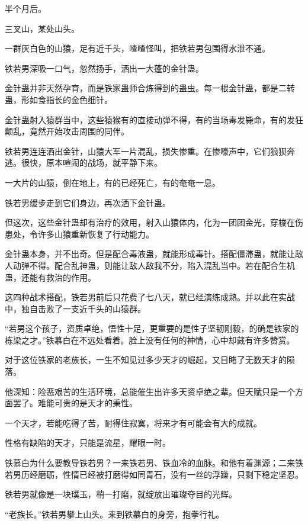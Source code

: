 
\begin{this_body}

半个月后。

三叉山，某处山头。

一群灰白色的山猿，足有近千头，喳喳怪叫，把铁若男包围得水泄不通。

铁若男深吸一口气，忽然扬手，洒出一大蓬的金针蛊。

金针蛊并非天然孕育，而是铁家蛊师合炼得到的蛊虫。每一根金针蛊，都是二转蛊，形如食指长的金色细针。

金针蛊射入猿群当中，这些猿猴有的直接动弹不得，有的当场毒发毙命，有的发狂颠乱，竟然开始攻击周围的同伴。

铁若男连连洒出金针，山猿大军一片混乱，损失惨重。在惨嚎声中，它们狼狈奔逃。很快，原本喧闹的战场，就平静下来。

一大片的山猿，倒在地上，有的已经死亡，有的奄奄一息。

铁若男缓步走到它们身边，再次洒下金针蛊。

但这次，这些金针蛊却有治疗的效用，射入山猿体内，化为一团团金光，穿梭在伤患处，令许多山猿重新恢复了行动能力。

金针蛊本身，并不出奇。但是配合毒液蛊，就能形成毒针。搭配僵滞蛊，就能让敌人动弹不得。配合乱神蛊，则能让敌人敌我不分，陷入混乱当中。若在配合生机蛊，还能有救治的作用。

这四种战术搭配，铁若男前后只花费了七八天，就已经演练成熟。并以此在实战中，独自击败了一支近千头的山猿群。

“若男这个孩子，资质卓绝，悟性十足，更重要的是性子坚韧刚毅，的确是铁家的栋梁之才。”铁慕白在不远处看着。脸上没有任何的神情，心中却藏有许多赞赏。

对于这位铁家的老族长，一生不知见过多少天才的崛起，又目睹了无数天才的陨落。

他深知：险恶艰苦的生活环境，总能催生出许多天资卓绝之辈。但天赋只是一个方面罢了。难能可贵的是天才的秉性。

一个天才，若能吃得了苦，耐得住寂寞，将来才有可能会有大的成就。

性格有缺陷的天才，只能是流星，耀眼一时。

铁慕白为什么要教导铁若男？一来铁若男、铁血冷的血脉。和他有着渊源；二来铁若男历经磨砺，性情已经被打磨得如同青石，没有一丝的浮躁，只剩下稳定坚忍。

铁若男就像是一块璞玉，稍一打磨，就绽放出璀璨夺目的光辉。

“老族长。”铁若男攀上山头。来到铁慕白的身旁，抱拳行礼。


\end{this_body}
